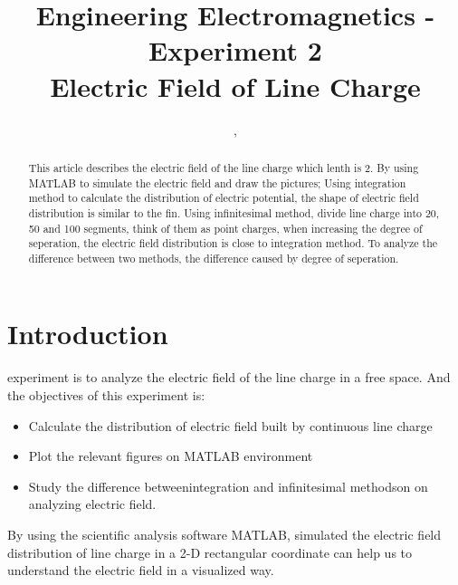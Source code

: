\documentclass[10pt, journal, final]{IEEEtran}
\begin{document}
\title{Engineering Electromagnetics - Experiment 2\\ Electric Field of Line Charge}
\author{,
    \\
}

\maketitle

\begin{abstract}
    This article describes the electric field of the line charge which lenth is 2.
    By using MATLAB to simulate the electric field and draw the pictures;
    Using integration method to calculate the distribution of electric potential,
    the shape of electric field distribution is similar to the fin.
    Using infinitesimal method, divide line charge into 20, 50 and 100 segments,
    think of them as point charges, when increasing the degree of seperation, the
    electric field distribution is close to integration method.
    To analyze the difference between two methods, the difference caused by
    degree of seperation.
\end{abstract}

\section{
  Introduction
 }
\label{sec:Intro}

 experiment is to analyze the electric field of
the line charge in a free space. And the objectives of this experiment is:
\begin{itemize}
    \item Calculate the distribution of electric field
          built by continuous line charge
    \item Plot the relevant figures on MATLAB environment
    \item Study the difference betweenintegration and infinitesimal methodson
          on analyzing electric field.
\end{itemize}\par

By using the scientific analysis software MATLAB,
simulated the electric field distribution of
line charge in a 2-D rectangular coordinate can help us to
understand the electric field in a visualized way.\par
\end{document}
